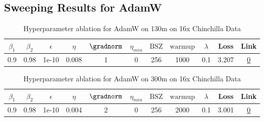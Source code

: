 \subsection{Sweeping Results for AdamW}%
\begin{table}[H]
\centering
\caption{Hyperparameter ablation for AdamW on 130m on 16x Chinchilla Data}
\label{tab:ablation_adamw_130m_on_16x_chinchilla_data}
\begin{tabular}{ccccccccccc}
\toprule
$\beta_1$ & $\beta_2$ & $\epsilon$ & $\eta$ & $\gradnorm$ & $\eta_{min}$ & $\mathrm{BSZ}$ & $\mathrm{warmup}$ & $\lambda$ & Loss & Link \\
\midrule
0.9 & 0.98 & 1e-10 & 0.008 & 1 & 0 & 256 & 1000 & 0.1 & 3.207 & \href{https://wandb.ai/stanford-mercury/optimizer-scaling/runs/sweep-130m-42B-adamwdf6bfb1lr0.008-wd0.1-minlr0-warmup1000-b10.9-c5d61d}{0} \\
\midrule
\bottomrule
\end{tabular}
\end{table}

\begin{table}[H]
\centering
\caption{Hyperparameter ablation for AdamW on 300m on 16x Chinchilla Data}
\label{tab:ablation_adamw_300m_on_16x_chinchilla_data}
\begin{tabular}{ccccccccccc}
\toprule
$\beta_1$ & $\beta_2$ & $\epsilon$ & $\eta$ & $\gradnorm$ & $\eta_{min}$ & $\mathrm{BSZ}$ & $\mathrm{warmup}$ & $\lambda$ & Loss & Link \\
\midrule
0.9 & 0.98 & 1e-10 & 0.004 & 2 & 0 & 256 & 2000 & 0.1 & 3.001 & \href{https://wandb.ai/stanford-mercury/optimizer-scaling/runs/sweep-300m-96B-adamwfcee97lr0.004-wd0.1-minlr0-warmup2000-b10.9--18b705}{0} \\
\midrule
\bottomrule
\end{tabular}
\end{table}

